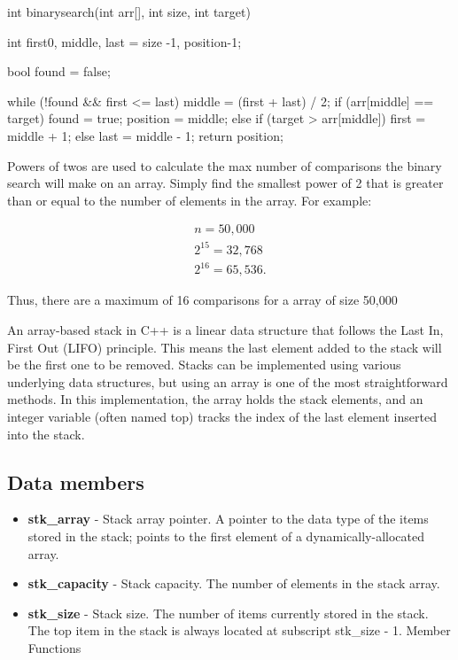 \documentclass{report}
\begin{document}
    \begin{cppcode}
int binarysearch(int arr[], int size, int target) {
    int first{0}, 
        middle,
        last = size -1,
        position{-1};

    bool found = false;

    while (!found && first <= last) {
        middle = (first + last) / 2;
        if (arr[middle] == target) {
            found = true;
            position = middle;
        } else if (target > arr[middle]) {
            first = middle + 1;
        } else {
            last = middle - 1;
        }
    }
    return position;
}
    \end{cppcode}
    
    \bigbreak \noindent 
    Powers of twos are used to calculate the max number of comparisons the binary search will make on an array. Simply find the smallest power of 2 that is greater than or equal to the number of elements in the array. For example:
    \bigbreak \noindent 
    \begin{minipage}[]{0.47\textwidth}
    \begin{align*}
        n = 50,000 \\
        2^{15} = 32,768 \\
        2^{16} = 65,536
    .\end{align*}
    \end{minipage}
    \begin{minipage}[t]{0.47\textwidth}
        Thus, there are a maximum of 16 comparisons for a array of size 50,000
    \end{minipage}

    \pagebreak 
    \bigbreak \noindent 
    \begin{concept}
        An array-based stack in C++ is a linear data structure that follows the Last In, First Out (LIFO) principle. This means the last element added to the stack will be the first one to be removed. Stacks can be implemented using various underlying data structures, but using an array is one of the most straightforward methods. In this implementation, the array holds the stack elements, and an integer variable (often named top) tracks the index of the last element inserted into the stack.
    \end{concept}
    \bigbreak \noindent 
    \subsection{Data members}
    \begin{itemize}
        \item \textbf{stk\_array} - Stack array pointer. A pointer to the data type of the items stored in the stack; points to the first element of a dynamically-allocated array.
        \item \textbf{stk\_capacity} - Stack capacity. The number of elements in the stack array.
        \item \textbf{stk\_size} - Stack size. The number of items currently stored in the stack. The top item in the stack is always located at subscript stk\_size - 1. Member Functions
    \end{itemize}
    \bigbreak \noindent 
\end{document}
